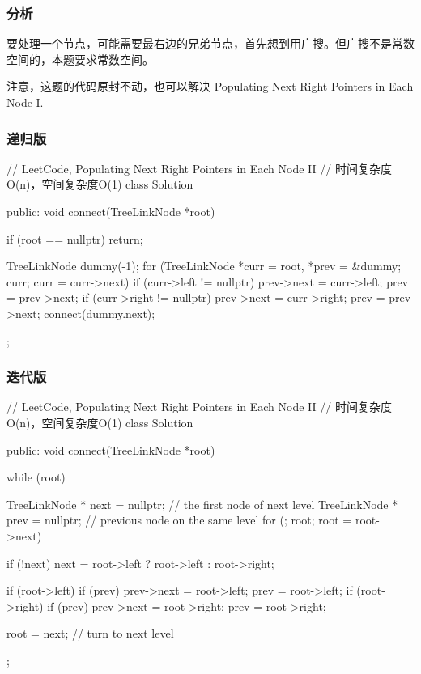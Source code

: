 \subsubsection{分析}
要处理一个节点，可能需要最右边的兄弟节点，首先想到用广搜。但广搜不是常数空间的，本题要求常数空间。

注意，这题的代码原封不动，也可以解决 Populating Next Right Pointers in Each Node I.


\subsubsection{递归版}
\begin{Code}
// LeetCode, Populating Next Right Pointers in Each Node II
// 时间复杂度O(n)，空间复杂度O(1)
class Solution {
public:
    void connect(TreeLinkNode *root) {
        if (root == nullptr) return;

        TreeLinkNode dummy(-1);
        for (TreeLinkNode *curr = root, *prev = &dummy; 
                curr; curr = curr->next) {
            if (curr->left != nullptr){
                prev->next = curr->left;
                prev = prev->next;
            }
            if (curr->right != nullptr){
                prev->next = curr->right;
                prev = prev->next;
            }
        }
        connect(dummy.next);
    }
};
\end{Code}


\subsubsection{迭代版}
\begin{Code}
// LeetCode, Populating Next Right Pointers in Each Node II
// 时间复杂度O(n)，空间复杂度O(1)
class Solution {
public:
    void connect(TreeLinkNode *root) {
        while (root) {
            TreeLinkNode * next = nullptr; // the first node of next level
            TreeLinkNode * prev = nullptr; // previous node on the same level
            for (; root; root = root->next) {
                if (!next) next = root->left ? root->left : root->right;

                if (root->left) {
                    if (prev) prev->next = root->left;
                    prev = root->left;
                }
                if (root->right) {
                    if (prev) prev->next = root->right;
                    prev = root->right;
                }
            }
            root = next; // turn to next level
        }
    }
};
\end{Code}



